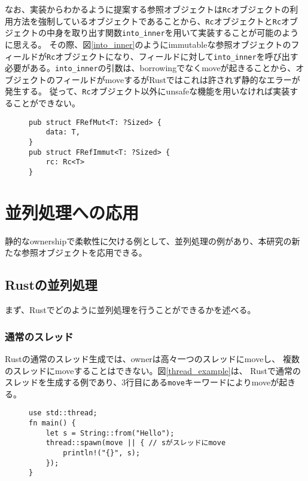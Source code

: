 \documentclass{sumiilab-paper}
\theoremstyle{mystyle}
\numberwithin{definition}{chapter} %
\begin{document}
なお、実装からわかるように提案する参照オブジェクトは\texttt{Rc}オブジェクトの利用方法を強制しているオブジェクトであることから、\texttt{Rc}オブジェクトと\texttt{Rc}オブジェクトの中身を取り出す関数\texttt{into\_inner}を用いて実装することが可能のように思える。
その際、図\ref{into_inner}のようにimmutableな参照オブジェクトのフィールドが\texttt{Rc}オブジェクトになり、フィールドに対して\texttt{into\_inner}を呼び出す必要がある。\texttt{into\_inner}の引数は、borrowingでなくmoveが起きることから、オブジェクトのフィールドがmoveするがRustではこれは許されず静的なエラーが発生する。
従って、\texttt{Rc}オブジェクト以外にunsafeな機能を用いなければ実装することができない。

\begin{figure}[htp]
\begin{lstlisting}[caption=Rcオブジェクトと関数into\_innerによる実装, label=into_inner, captionpos=b]
pub struct FRefMut<T: ?Sized> {
    data: T,
}
pub struct FRefImmut<T: ?Sized> {
    rc: Rc<T>
}
\end{lstlisting}
\end{figure}

\chapter{並列処理への応用}
静的なownershipで柔軟性に欠ける例として、並列処理の例があり、本研究の新たな参照オブジェクトを応用できる。

\section{Rustの並列処理}
まず、Rustでどのように並列処理を行うことができるかを述べる。
\subsection{通常のスレッド}
Rustの通常のスレッド生成では、ownerは高々一つのスレッドにmoveし、
複数のスレッドにmoveすることはできない。図\ref{thread_example}は、
Rustで通常のスレッドを生成する例であり、3行目にある\texttt{move}キーワードによりmoveが起きる。
\begin{figure}[htp]
\begin{lstlisting}[caption=Rustでの通常のスレッド生成の例, 
  label=thread_example, captionpos=b]
use std::thread;
fn main() {
    let s = String::from("Hello");
    thread::spawn(move || { // sがスレッドにmove
        println!("{}", s);
    });
}
\end{lstlisting}
\end{figure}
\end{document}
